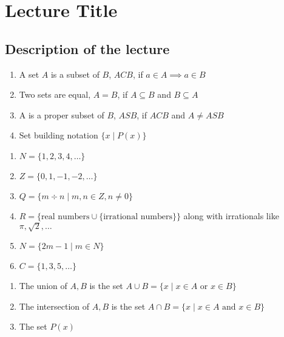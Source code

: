 \documentclass{article}
\begin{document}
\section*{Lecture Title}
\subsection*{Description of the lecture}

\begin{enumerate}
\item A set $A$ is a subset of $B$, $ACB$, if $a \in A \implies a \in B$
\item Two sets are equal, $A=B$, if $A \subseteq B$ and $B \subseteq A$
\item A is a proper subset of $B$, $ASB$, if $ACB$ and $A \neq ASB$
\item Set building notation $\{ x \mid P(x) \}$
\end{enumerate}

\begin{enumerate}
\item $N=\{1,2,3,4,\ldots\}$
\item $Z=\{0,1,-1,-2,\ldots\}$
\item $Q=\{m \div n \mid m,n \in Z, n \neq 0\}$
\item $R = \{\text{real numbers} \cup \{\text{irrational numbers}\} \}$ along with irrationals like $\pi, \sqrt{2}, \ldots$
\item $N=\{2m-1 \mid m \in N\}$
\item $C=\{1,3,5,\ldots\}$
\end{enumerate}

\begin{enumerate}
\item The union of $A,B$ is the set $A \cup B = \{x \mid x \in A \text{ or } x \in B\}$
\item The intersection of $A,B$ is the set $A \cap B = \{x \mid x \in A \text{ and } x \in B\}$
\item The set $P(x)$
\end{enumerate}
\end{document}
